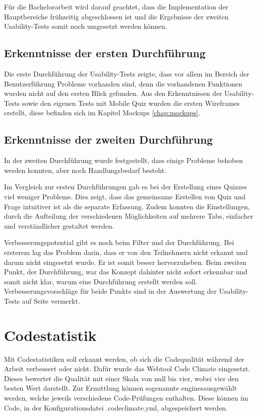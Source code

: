 Für die Bachelorarbeit wird darauf geachtet, dass die Implementation der Hauptbereiche frühzeitig abgeschlossen ist und die Ergebnisse der zweiten Usability-Tests somit noch umgesetzt werden können. 


\subsection{Erkenntnisse der ersten Durchführung}
Die erste Durchführung der \gls{Usability-Test}s zeigte, dass vor allem im Bereich der Benutzerführung Probleme vorhanden sind, denn die vorhandenen Funktionen wurden nicht auf den ersten Blick gefunden.
Aus den Erkenntnissen der Usability-Tests sowie den eigenen Tests mit Mobile Quiz wurden die ersten \gls{Wireframes} erstellt, diese befinden sich im Kapitel Mockups \ref{chap:mockups}.

\subsection{Erkenntnisse der zweiten Durchführung}
In der zweiten Durchführung wurde festgestellt, dass einige Probleme behoben werden konnten, aber noch Handlungsbedarf besteht.

Im Vergleich zur ersten Durchführungen gab es bei der Erstellung eines Quizzes viel weniger Probleme. Dies zeigt, dass das gemeinsame Erstellen von Quiz und Frage intuitiver ist als die separate Erfassung. Zudem konnten die Einstellungen, durch die Aufteilung der verschiedenen Möglichkeiten auf mehrere Tabs, einfacher und verständlicher gestaltet werden.

Verbesserungspotential gibt es noch beim Filter und der Durchführung. Bei ersterem lag das Problem darin, dass er von den Teilnehmern nicht erkannt und darum nicht eingesetzt wurde. Er ist somit besser hervorzuheben. Beim zweiten Punkt, der Durchführung, war das Konzept dahinter nicht sofort erkennbar und somit nicht klar, warum eine Durchführung erstellt werden soll. Verbesserungsvorschläge für beide Punkte sind in der Auswertung der Usability-Tests auf Seite \hyperlink{page.\getpagerefnumber{pdf:UTAW2}}{} vermerkt.





\newpage
\section{Codestatistik}
Mit Codestatistiken soll erkannt werden, ob sich die Codequalität während der Arbeit verbessert oder nicht. Dafür wurde das Webtool Code Climate \cite{codeclimate.com} eingesetzt. Dieses bewertet die Qualität mit einer Skala von null bis vier, wobei vier den besten Wert darstellt. Zur Ermittlung können sogenannte \glqq engines\grqq ausgewählt werden, welche jeweils verschiedene Code-Prüfungen enthalten. Diese können im Code, in der Konfigurationsdatei \glqq .codeclimate.yml\grqq, abgespeichert werden.\\


